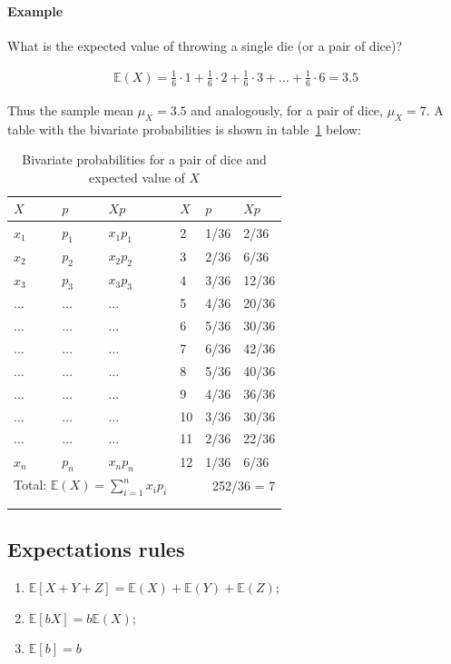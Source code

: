 \paragraph{Example} What is the expected value of throwing a single die (or a pair of dice)?

\begin{eqnarray*}
\mathbb{E}(X) = \frac{1}{6}\cdot 1 + \frac{1}{6}\cdot 2 + \frac{1}{6}\cdot 3 + \ldots + \frac{1}{6}\cdot 6 = 3.5
\end{eqnarray*}

Thus the sample mean $\mu_{X} = 3.5$ and analogously, for a pair of dice, $\mu_{X} = 7$. A table with the bivariate probabilities is shown in table~\ref{tbl_Dice} below:


\begin{table}[htp] 
\centering
\caption{Bivariate probabilities for a pair of dice and expected value of $X$}
\footnotesize
\bigskip
\begin{tabular}{lll|lll}\label{tbl_Dice}
\\ \hline
\hline
$X$&$p$&$Xp$&$X$&$p$&$Xp$\\
\hline
$x_{1}$ & $p_{1}$ & $x_{1}p_{1}$ & 2 & 1/36 & 2/36\\
$x_{2}$ & $p_{2}$ & $x_{2}p_{2}$ & 3 & 2/36 & 6/36\\
$x_{3}$ & $p_{3}$ & $x_{3}p_{3}$ & 4 & 3/36 & 12/36\\
$\ldots$ & $\ldots$ & $\ldots$ & 5 & 4/36 & 20/36\\
$\ldots$ & $\ldots$ & $\ldots$ & 6 & 5/36 & 30/36\\
$\ldots$ & $\ldots$ & $\ldots$ & 7 & 6/36 & 42/36\\
$\ldots$ & $\ldots$ & $\ldots$ & 8 & 5/36 & 40/36\\
$\ldots$ & $\ldots$ & $\ldots$ & 9 & 4/36 & 36/36\\
$\ldots$ & $\ldots$ & $\ldots$ & 10 & 3/36 & 30/36\\
$\ldots$ & $\ldots$ & $\ldots$ & 11 & 2/36 & 22/36\\
$x_{n}$ & $p_{n}$ & $x_{n}p_{n}$ & 12 & 1/36 & 6/36\\

\hline
\multicolumn{3}{l}{Total: $\mathbb{E}(X)=\sum^{n}_{i=1}x_{i}p_{i}$}&&\multicolumn{2}{r}{252/36 = 7}\\
\hline \\
\normalsize
\end{tabular}
\end{table}


\subsection{Expectations rules}
\begin{enumerate}
\item $\mathbb{E}[X + Y + Z] = \mathbb{E}(X) + \mathbb{E}(Y) + \mathbb{E}(Z);$
\item $\mathbb{E}[bX] = b\mathbb{E}(X);$
\item $\mathbb{E}[b] = b$
\end{enumerate}

